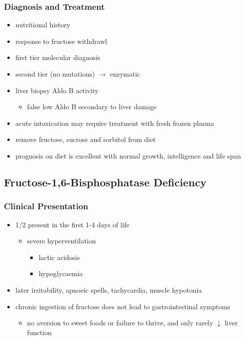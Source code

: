 \documentclass{scrartcl}
\begin{document}
\subsubsection{Diagnosis and Treatment}
\label{sec:org9fe7e88}
\begin{itemize}
\item nutritional history
\item response to fructose withdrawl
\item first tier molecular diagnosis
\item second tier (no mutations) \(\to\) enzymatic
\item liver biopsy Aldo B activity
\begin{itemize}
\item false low Aldo B secondary to liver damage
\end{itemize}
\item acute intoxication may require treatment with fresh frozen plasma
\item remove fructose, sucrose and sorbitol from diet
\item prognosis on diet is excellent with normal growth,
intelligence and life span
\end{itemize}

\subsection{Fructose-1,6-Bisphosphatase Deficiency}
\label{sec:org9c4aa92}
\subsubsection{Clinical Presentation}
\label{sec:org5bd440f}
\begin{itemize}
\item 1/2 present in the first 1-4 days of life
\begin{itemize}
\item severe hyperventilation
\begin{itemize}
\item lactic acidosis
\item hypoglycaemia
\end{itemize}
\end{itemize}
\item later irritability, apnoeic spells, tachycardia, muscle hypotonia
\item chronic ingestion of fructose does not lead to gastrointestinal symptoms
\begin{itemize}
\item no aversion to sweet foods or failure to thrive, and only rarely \(\downarrow\) liver function
\end{itemize}
\end{itemize}
\end{document}
